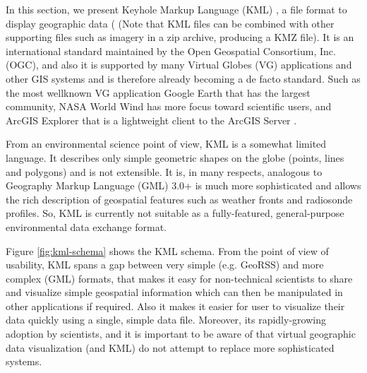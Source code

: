 In this section, we present Keyhole Markup Language (KML) \parencite{Google.kml.2016}, a file format to display geographic data ( (Note that KML files can be combined with other supporting files such as imagery in a zip archive, producing a KMZ file). It is an international standard maintained by the Open Geospatial Consortium, Inc. (OGC), and also it is supported by many Virtual Globes (VG) applications and other GIS systems and is therefore already becoming a de facto standard. Such as the most wellknown VG application Google Earth that has the largest community, NASA World Wind has more focus toward scientific users, and ArcGIS Explorer that is a lightweight client to the ArcGIS Server \parencite{blower.sharing-visualizing.2007}.

From an environmental science point of view, KML is a somewhat limited language. It describes only simple geometric shapes on the globe (points, lines and polygons) and is not extensible. It is, in many respects, analogous to Geography Markup Language (GML) 3.0+ is much more sophisticated and allows the rich description of geospatial features such as weather fronts and radiosonde profiles. So, KML is currently not suitable as a fully-featured, general-purpose environmental data exchange format.

Figure \ref{fig:kml-schema} shows the KML schema. From the point of view of usability, KML spans a gap between very simple (e.g. GeoRSS) and more complex (GML) formats, that makes it easy for non-technical scientists to share and visualize simple geospatial information which can then be manipulated in other applications if required. Also it makes it easier for user to visualize their data quickly using a single, simple data file. Moreover, its rapidly-growing adoption by scientists, and it is important to be aware of that virtual geographic data visualization (and KML) do not attempt to replace more sophisticated systems. 

